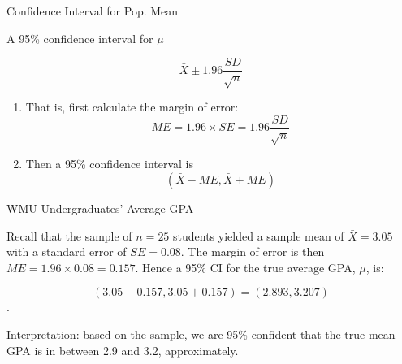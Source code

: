 \documentclass[14pt]{beamer}\usepackage[]{graphicx}\usepackage[]{color}
\begin{document}
\begin{frame}[fragile]{Confidence Interval for Pop. Mean}

A 95\% confidence interval for $\mu$

\begin{equation*}
  \bar{X} \pm 1.96 \frac{SD}{\sqrt{n}}
\end{equation*}

\begin{enumerate}
\item That is, first calculate the margin of error:
\begin{equation*}
ME = 1.96 \times SE = 1.96 \frac{SD}{\sqrt{n}}
\end{equation*}
\item Then a 95\% confidence interval is
\begin{equation*}
(\bar{X} - ME, \bar{X} + ME)
\end{equation*}
\end{enumerate}
\end{frame}

\begin{frame}[fragile]{WMU Undergraduates’ Average GPA}

Recall that the sample of $n = 25$ students yielded a sample mean of $\bar{X} = 3.05$ with a standard error of $SE = 0.08$.  The margin of error is then $ME = 1.96 \times 0.08 = 0.157$. Hence a 95\% CI for the true average  GPA, $\mu$, is:

$$(3.05 - 0.157, 3.05 + 0.157) = (2.893, 3.207)$$.

Interpretation: based on the sample, we are 95\% confident that the  true mean GPA is in between 2.9 and 3.2, approximately.
\end{frame}




%


\end{document}
